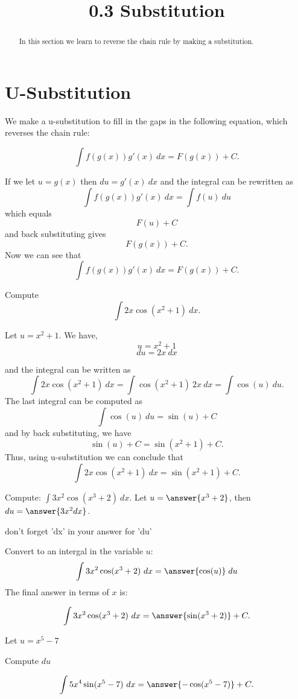 \documentclass{ximera}
\title{0.3 Substitution}
\begin{document}
\begin{abstract}
In this section we learn to reverse the chain rule by making a substitution.
\end{abstract}

\maketitle

\section{U-Substitution}

We make a u-substitution to fill in the gaps in the following equation, which reverses the chain rule:

\[\int f(g(x))g'(x) \ dx = F(g(x)) + C. \]

If we let $ u = g(x)$ then $du = g'(x) \ dx$ and the integral can be rewritten as
\[\int f(g(x))g'(x) \ dx = \int f(u) \ du \]
which equals
\[F(u) + C\]
and back substituting gives
\[F(g(x)) + C. \]
Now we can see that
\[\int f(g(x))g'(x) \ dx = F(g(x)) + C. \]



\begin{example}
Compute 
\[\int 2x\cos(x^2 + 1) \ dx.\]

Let $u = x^2 + 1$.  We have,
\[u = x^2 + 1\]
\[du = 2x \ dx\]

and the integral can be written as 
\[\int 2x\cos(x^2 + 1) \ dx = \int \cos(x^2 + 1) \ 2x\  dx = \int \cos(u) \ du.\]
The last integral can be computed as 
\[\int \cos(u) \ du = \sin(u) + C\]
and by back substituting, we have 
\[\sin(u) + C = \sin(x^2 + 1) + C.\]
Thus, using u-substitution we can conclude that
\[\int 2x\cos(x^2 + 1) \ dx =  \sin(x^2 + 1) + C.\]
\end{example}

\begin{problem} Compute: $\displaystyle{\int 3x^2\cos(x^3 + 2) \ dx.}$
Let $u = \answer{x^3 + 2}$, then $du = \answer{3x^2 dx}$.
\begin{hint}
don't forget 'dx' in your answer for 'du'
\end{hint}
Convert to an intergal in the variable $u$:
\[\int 3x^2\cos(x^3 + 2) \ dx = \answer{\cos(u)} \; du\]
The final answer in terms of $x$ is:

\[\int 3x^2\cos(x^3 + 2) \ dx = \answer{\sin(x^3 + 2)} +C.\]
\end{problem}

\begin{problem}
\begin{hint}
Let $u = x^5 -7$
\end{hint}
\begin{hint}
Compute $du$
\end{hint}
\[\int 5x^4\sin(x^5 -7) \ dx = \answer{-\cos(x^5 -7)} +C.\]
\end{problem}
\end{document}
